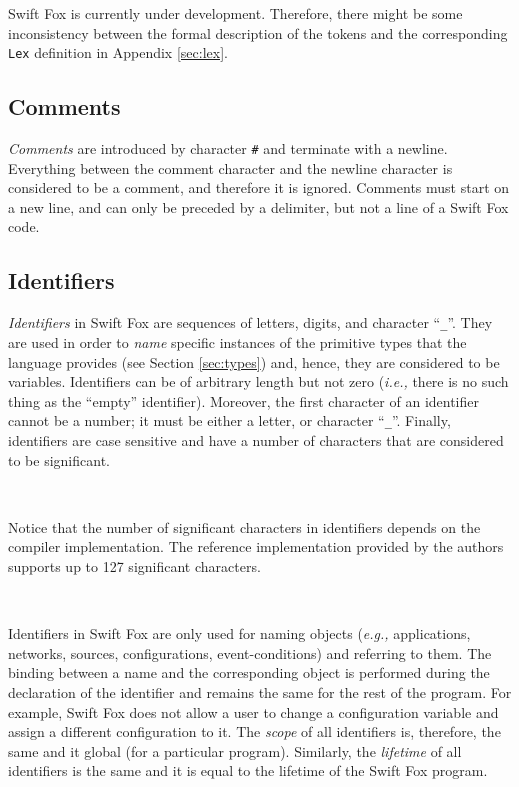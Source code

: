 \documentclass[11pt]{article}
\begin{document}
\hangindent=4cm
\small
\noindent
Swift Fox is currently under development. Therefore, there might be some
inconsistency between the formal description of the tokens and the
corresponding \texttt{Lex} definition in Appendix \ref{sec:lex}.
\normalsize

\subsection{Comments}

\textit{Comments} are introduced by character \texttt{\#} and terminate
with a newline. Everything between the comment character and the newline
character is considered to be a comment, and therefore it is ignored.
Comments must start on a new line, and can only be preceded by a delimiter,
but not a line of a Swift Fox code.

\subsection{Identifiers}

\textit{Identifiers} in Swift Fox are sequences of letters, digits, and
character ``\texttt{\_}''. They are used in order to \textit{name} specific
instances of the primitive types that the language provides (see Section
\ref{sec:types}) and, hence, they are considered to be variables.
Identifiers can be of arbitrary length but not zero (\textit{i.e.,} there
is no such thing as the ``empty'' identifier). Moreover, the first
character of an identifier cannot be a number; it must be either a
letter, or character ``\texttt{\_}''. Finally, identifiers are case
sensitive and have a number of characters that are considered to be
significant.
 
\

\hangindent=4cm
\small
\noindent
Notice that the number of significant characters in identifiers depends on 
the compiler implementation. The reference implementation provided by the
authors supports up to 127 significant characters.
\normalsize

\

Identifiers in Swift Fox are only used for naming objects (\textit{e.g.,}
applications, networks, sources, configurations, event-conditions) and
referring to them. The binding between a name and the corresponding object
is performed during the declaration of the identifier and remains the same 
for the rest of the program. For example, Swift Fox does not allow a user 
to change a configuration variable and assign a different configuration 
to it. The \textit{scope} of all identifiers is, therefore, the same and
it global (for a particular program). Similarly, the \textit{lifetime} of 
all identifiers is the same and it is equal to the lifetime of the Swift 
Fox program. 
\end{document}
